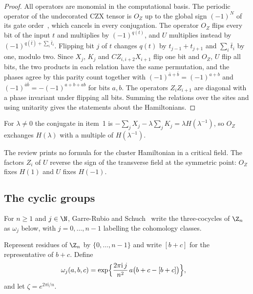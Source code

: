 \begin{proof}
    \leanok
    All operators are monomial in the computational basis. The periodic
    operator of the undecorated CZX tensor is $O_Z$ up to the global sign
    $(-1)^N$ of its gate order~\cite{gap:mpu_czx_tensor_normalization},
    which cancels in every conjugation. The operator
    $O_Z$ flips every bit of the input $t$ and multiplies by $(-1)^{q(t)}$,
    and $U$ multiplies instead by $(-1)^{q(\bar t)+\sum_i\bar t_i}$.
    Flipping bit $j$ of $t$ changes $q(t)$ by $t_{j-1}+t_{j+1}$ and
    $\sum_i\bar t_i$ by one, modulo two. Since $X_j$, $K_j$ and
    $CZ_{i,i+2}X_{i+1}$ flip one bit and $O_Z$, $U$ flip all bits, the two
    products in each relation have the same permutation, and the phases
    agree by this parity count together with
    $(-1)^{\bar a+\bar b}=(-1)^{a+b}$ and
    $(-1)^{\bar a\bar b}=-(-1)^{a+b+ab}$ for bits $a,b$. The operators
    $Z_iZ_{i+1}$ are diagonal with a phase invariant under flipping all bits.
    Summing the relations over the sites and using unitarity gives the
    statements about the Hamiltonians.
\end{proof}

For $\lambda\neq0$ the conjugate in item~1 is
$-\sum_jX_j-\lambda\sum_jK_j=\lambda H(\lambda^{-1})$, so $O_Z$ exchanges
$H(\lambda)$ with a multiple of $H(\lambda^{-1})$.

The review prints no formula for the cluster Hamiltonian in a critical field.
The factors $Z_i$ of $U$ reverse the sign of the transverse field at the
symmetric point: $O_Z$ fixes $H(1)$ and $U$ fixes $H(-1)$.

\subsection{The cyclic groups}

For $n\geq1$ and $j\in\N$, Garre-Rubio and
Schuch~\cite[Section~IV.D]{GarreRubioSchuch2024DomainWall} write the
three-cocycles of $\Z_n$ as $\omega_j$ below, with $j=0,\ldots,n-1$
labelling the cohomology classes.

\begin{definition}
    \label{def:asymex_group_cocycle_cyclic}
    \leanok
    Represent residues of $\Z_n$ by $\{0,\ldots,n-1\}$ and write
    $[b+c]$ for the representative of $b+c$. Define
    \begin{align}
        \omega_j(a,b,c)
         & =\exp\Bigl\{\frac{2\pi\mathrm{i}\,j}{n^2}\,a\bigl(b+c-[b+c]\bigr)\Bigr\},
        \notag
    \end{align}
    and let $\zeta=e^{2\pi\mathrm{i}/n}$.
\end{definition}

